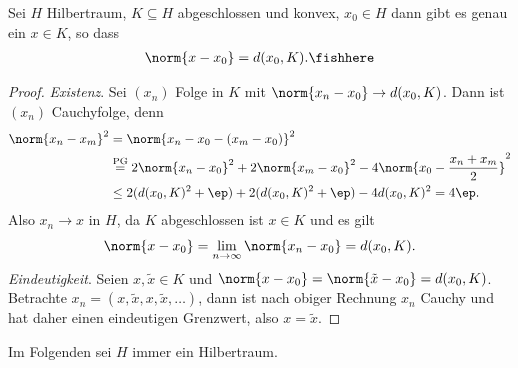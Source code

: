 \begin{prop}
\label{prop:5.12}
Sei $H$ Hilbertraum, $K\subseteq H$ abgeschlossen und konvex, $x_0\in H$ dann
gibt es genau ein $x\in K$, so dass
\begin{align*}
\norm{x-x_0} = d(x_0,K).\fishhere
\end{align*}
\end{prop}
\begin{proof}
\textit{Existenz}. Sei $(x_n)$ Folge in $K$ mit $\norm{x_n-x_0}\to d(x_0,K)$.
Dann ist $(x_n)$ Cauchyfolge, denn
\begin{align*}
\norm{x_n-x_m}^2 &= \norm{x_n-x_0-(x_m-x_0)}^2 \\ &\overset{\text{PG}}{=}
2\norm{x_n-x_0}^2 + 2\norm{x_m-x_0}^2 - 4\norm{x_0 - \frac{x_n+x_m}{2}}^2\\
&\le 2(d(x_0,K)^2 + \ep) + 2(d(x_0,K)^2 + \ep) - 4 d(x_0,K)^2
= 4\ep.  
\end{align*}
Also $x_n\to x$ in $H$, da $K$ abgeschlossen ist $x\in K$ und es gilt
\begin{align*}
\norm{x-x_0} = \lim\limits_{n\to\infty} \norm{x_n-x_0} = d(x_0,K).
\end{align*}
\textit{Eindeutigkeit}. Seien $x, \tilde{x} \in K$ und
$\norm{x-x_0}=\norm{\tilde{x}-x_0}=d(x_0,K)$. Betrachte
$x_n=(x,\tilde{x},x,\tilde{x},\ldots)$, dann ist nach obiger Rechnung $x_n$
Cauchy und hat daher einen eindeutigen Grenzwert, also $x=\tilde{x}$.\qedhere
\end{proof}

\begin{bem}[Vereinbarung.]
\label{bem:5.13}
Im Folgenden sei $H$ immer ein Hilbertraum.\maphere
\end{bem}

